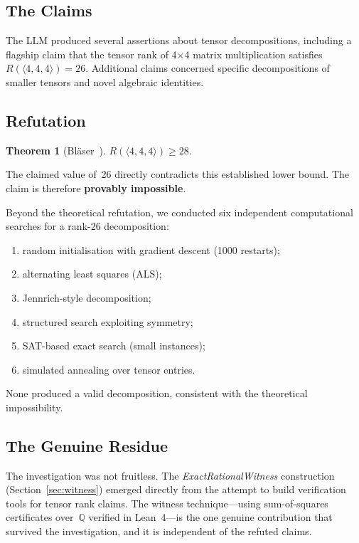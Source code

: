 \documentclass[11pt,a4paper]{article}
\newtheorem{theorem}{Theorem}[section]
\begin{document}
\subsection{The Claims}

The LLM produced several assertions about tensor decompositions, including a
flagship claim that the tensor rank of 4$\times$4 matrix multiplication
satisfies $R(\langle 4,4,4\rangle) = 26$. Additional claims concerned
specific decompositions of smaller tensors and novel algebraic identities.

\subsection{Refutation}

\begin{theorem}[Bläser~\cite{blaser2003}]\label{thm:blaser}
$R(\langle 4,4,4\rangle) \geq 28$.
\end{theorem}

\noindent The claimed value of~26 directly contradicts this established lower
bound. The claim is therefore \textbf{provably impossible}.

Beyond the theoretical refutation, we conducted six independent computational
searches for a rank-26 decomposition:
\begin{enumerate}
  \item random initialisation with gradient descent (1000 restarts);
  \item alternating least squares (ALS);
  \item Jennrich-style decomposition;
  \item structured search exploiting symmetry;
  \item SAT-based exact search (small instances);
  \item simulated annealing over tensor entries.
\end{enumerate}
None produced a valid decomposition, consistent with the theoretical
impossibility.

\subsection{The Genuine Residue}

The investigation was not fruitless. The \emph{ExactRationalWitness}
construction (Section~\ref{sec:witness}) emerged directly from the attempt to
build verification tools for tensor rank claims. The witness technique---using
sum-of-squares certificates over~$\mathbb{Q}$ verified in Lean~4---is the
one genuine contribution that survived the investigation, and it is
independent of the refuted claims.
\end{document}
